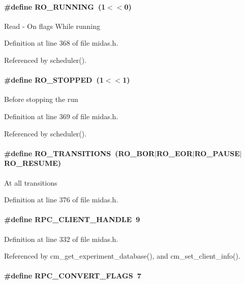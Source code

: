 \paragraph[{RO\_\-RUNNING}]{\setlength{\rightskip}{0pt plus 5cm}\#define RO\_\-RUNNING~(1$<$$<$0)}\hfill\label{group__mdefineh_gafc5ef41cae398b8500f9c3a42cef6d2c}
Read -\/ On flags While running 

Definition at line 368 of file midas.h.

Referenced by scheduler().
\paragraph[{RO\_\-STOPPED}]{\setlength{\rightskip}{0pt plus 5cm}\#define RO\_\-STOPPED~(1$<$$<$1)}\hfill\label{group__mdefineh_ga05a5abc619ab24e168695befc7c0b4be}
Before stopping the run 

Definition at line 369 of file midas.h.

Referenced by scheduler().
\paragraph[{RO\_\-TRANSITIONS}]{\setlength{\rightskip}{0pt plus 5cm}\#define RO\_\-TRANSITIONS~(RO\_\-BOR$|$RO\_\-EOR$|$RO\_\-PAUSE$|$RO\_\-RESUME)}\hfill\label{group__mdefineh_gadcbbd9e66d9455950d508d10b32b1f74}
At all transitions 

Definition at line 376 of file midas.h.
\paragraph[{RPC\_\-CLIENT\_\-HANDLE}]{\setlength{\rightskip}{0pt plus 5cm}\#define RPC\_\-CLIENT\_\-HANDLE~9}\hfill\label{group__mdefineh_ga2ef5ce0b2c01e38ea5152abfc357dbad}


Definition at line 332 of file midas.h.

Referenced by cm\_\-get\_\-experiment\_\-database(), and cm\_\-set\_\-client\_\-info().
\paragraph[{RPC\_\-CONVERT\_\-FLAGS}]{\setlength{\rightskip}{0pt plus 5cm}\#define RPC\_\-CONVERT\_\-FLAGS~7}\hfill\label{group__mdefineh_gaddb075d303a5903df6a7dabdad02defd}


